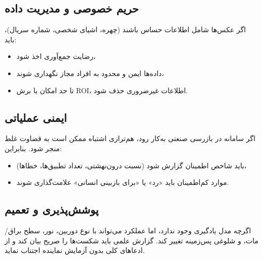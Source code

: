 
\subsection{حریم خصوصی و مدیریت داده}
اگر عکس‌ها شامل اطلاعات حساس باشند (چهره، اشیای شخصی، شماره سریال)، باید:
\begin{itemize}
  \item رضایت جمع‌آوری اخذ شود،
  \item داده‌ها ایمن و محدود به افراد مجاز نگهداری شوند،
  \item تا حد امکان با برش ROI، اطلاعات غیرضروری حذف شود.
\end{itemize}

\subsection{ایمنی عملیاتی}
اگر سامانه در بازرسی صنعتی به‌کار رود، هم‌ترازی اشتباه ممکن است به قضاوت غلط منجر شود. بنابراین:
\begin{itemize}
  \item باید شاخص اطمینان گزارش شود (نسبت درون‌نهشتی، تعداد تطبیق‌ها، خطاها)،
  \item موارد کم‌اطمینان باید «رد» یا «برای بازبینی انسانی» علامت‌گذاری شوند.
\end{itemize}

\subsection{پوشش‌پذیری و تعمیم}
اگرچه مدل یادگیری وجود ندارد، اما عملکرد می‌تواند با نوع دوربین، نور، سطح براق/مات، و شلوغی پس‌زمینه تغییر کند. گزارش علمی باید شکست‌ها را صریح بیان کند و از ادعاهای کلی بدون آزمایش نماینده اجتناب نماید.
